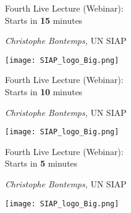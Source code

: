 \documentclass[xcolor=x11names,compress, aspectratio=169]{beamer}
\renewcommand{\(}{\begin{columns}}
\renewcommand{\)}{\end{columns}}
\newcommand{\<}[1]{\begin{column}{#1}}
\renewcommand{\>}{\end{column}}
\begin{document}
\begin{frame}
\Large{ \color{siap}{Machine Learning for Official Statistics and SDGs}}
\vspace{0.5cm}

{\huge\textcolor{brique}{Fourth Live Lecture (Webinar): \\
\vspace{0.2cm}
Starts in \textbf{15} minutes\\
}}

\vspace{0.5cm}
\begin{center}
\textcolor{siap}{\textit{Christophe Bontemps,} UN  SIAP\\ }
\vspace{1cm}

\texttt{[image: SIAP\_logo\_Big.png]}
\end{center}
\end{frame}

\begin{frame}
\Large{ \color{siap}{Machine Learning for Official Statistics and SDGs}}
\vspace{0.5cm}

{\huge\textcolor{brique}{Fourth Live Lecture (Webinar): \\
\vspace{0.2cm}
Starts in \textbf{10} minutes\\
}}

\vspace{0.5cm}
\begin{center}
\textcolor{siap}{\textit{Christophe Bontemps,} UN  SIAP\\ }
\vspace{1cm}

\texttt{[image: SIAP\_logo\_Big.png]}
\end{center}
\end{frame}

\begin{frame}
\Large{ \color{siap}{Machine Learning for Official Statistics and SDGs}}
\vspace{0.5cm}

{\huge\textcolor{brique}{Fourth Live Lecture (Webinar): \\
\vspace{0.2cm}
Starts in \textbf{5} minutes\\
}}

\vspace{0.5cm}
\begin{center}
\textcolor{siap}{\textit{Christophe Bontemps,} UN  SIAP\\ }
\vspace{1cm}

\texttt{[image: SIAP\_logo\_Big.png]}
\end{center}
\end{frame}
\end{document}
